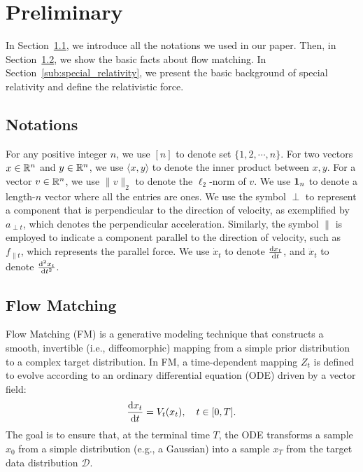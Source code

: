 \section{Preliminary} \label{sec:preli}

In Section~\ref{sub:notation}, we introduce all the notations we used in our paper. Then, in Section~\ref{sub:flow_matching}, we show the basic facts about flow matching. In Section~\ref{sub:special_relativity}, we present the basic background of special relativity and define the relativistic force.

\subsection{Notations} \label{sub:notation}

For any positive integer $n$, we use $[n]$ to denote set $\{1,2,\cdots, n\}$. 
For two vectors $x \in \mathbb{R}^n$ and $y \in \mathbb{R}^n$, we use $\langle x, y \rangle$ to denote the inner product between $x,y$.
For a vector $v \in \mathbb{R}^n$, we use $\|v\|_2$ to denote the $\ell_2$-norm of $v$.
We use ${\bf 1}_n$ to denote a length-$n$ vector where all the entries are ones.
We use the symbol $ \perp $ to represent a component that is perpendicular to the direction of velocity, as exemplified by $ a_{\perp t} $, which denotes the perpendicular acceleration. Similarly, the symbol $ \parallel $ is employed to indicate a component parallel to the direction of velocity, such as $ f_{\parallel t} $, which represents the parallel force. We use $\dot{x}_t$ to denote $\frac{\mathrm{d} x_t}{\mathrm{d} t}$, and $\ddot{x}_t$ to denote $\frac{\mathrm{d}^2 x_t}{\mathrm{d} t^2}$.


\subsection{Flow Matching} \label{sub:flow_matching}

Flow Matching (FM) \cite{lcb+22,lgl22} is a generative modeling technique that constructs a smooth, invertible (i.e., diffeomorphic) mapping from a simple prior distribution to a complex target distribution. In FM, a time-dependent mapping $Z_t$ is defined to evolve according to an ordinary differential equation (ODE) driven by a vector field:
\begin{align*}
    \frac{\mathrm{d} x_t}{\mathrm{d} t} = V_t(x_t), \quad t \in [0, T].
\end{align*}
The goal is to ensure that, at the terminal time $T$, the ODE transforms a sample $x_0$ from a simple distribution (e.g., a Gaussian) into a sample $x_T$ from the target data distribution $\mathcal{D}$.

